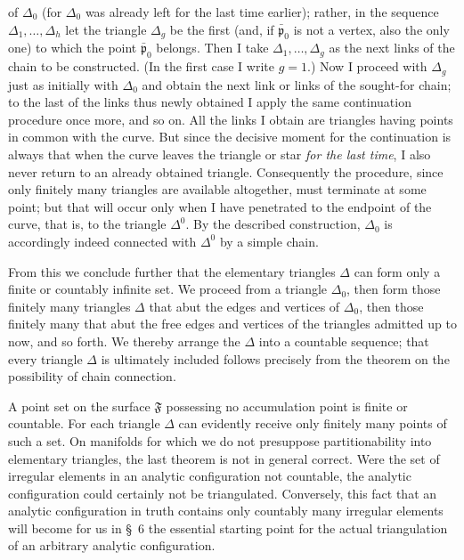 \documentclass{article}
\begin{document}
of $\Delta_0$ (for $\Delta_0$ was already left for the last time earlier); rather, in the sequence $\Delta_1, \dots, \Delta_h$ let the triangle $\Delta_g$ be the first (and, if $\bar{\mathfrak{p}}_0$ is not a vertex, also the only one) to which the point $\bar{\mathfrak{p}}_0$ belongs. Then I take $\Delta_1, \dots, \Delta_g$ as the next links of the chain to be constructed. (In the first case I write $g = 1$.) Now I proceed with $\Delta_g$ just as initially with $\Delta_0$ and obtain the next link or links of the sought-for chain; to the last of the links thus newly obtained I apply the same continuation procedure once more, and so on. All the links I obtain are triangles having points in common with the curve. But since the decisive moment for the continuation is always that when the curve leaves the triangle or star \emph{for the last time}, I also never return to an already obtained triangle. Consequently the procedure, since only finitely many triangles are available altogether, must terminate at some point; but that will occur only when I have penetrated to the endpoint of the curve, that is, to the triangle $\Delta^0$. By the described construction, $\Delta_0$ is accordingly indeed connected with $\Delta^0$ by a simple chain.

From this we conclude further that the elementary triangles $\Delta$ can form only a finite or countably infinite set. We proceed from a triangle $\Delta_0$, then form those finitely many triangles $\Delta$ that abut the edges and vertices of $\Delta_0$, then those finitely many that abut the free edges and vertices of the triangles admitted up to now, and so forth. We thereby arrange the $\Delta$ into a countable sequence; that every triangle $\Delta$ is ultimately included follows precisely from the theorem on the possibility of chain connection.

A point set on the surface $\mathfrak{F}$ possessing no accumulation point is finite or countable. For each triangle $\Delta$ can evidently receive only finitely many points of such a set. On manifolds for which we do not presuppose partitionability into elementary triangles, the last theorem is not in general correct. Were the set of irregular elements in an analytic configuration not countable, the analytic configuration could certainly not be triangulated. Conversely, this fact that an analytic configuration in truth contains only countably many irregular elements will become for us in §~6 the essential starting point for the actual triangulation of an arbitrary analytic configuration.
\end{document}
